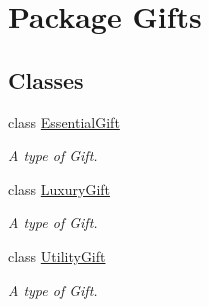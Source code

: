 \hypertarget{namespace_gifts}{}\section{Package Gifts}
\label{namespace_gifts}
\subsection*{Classes}
\begin{DoxyCompactItemize}
\item 
class \hyperlink{class_gifts_1_1_essential_gift}{Essential\+Gift}
\begin{DoxyCompactList}\small\item\em A type of Gift. \end{DoxyCompactList}\item 
class \hyperlink{class_gifts_1_1_luxury_gift}{Luxury\+Gift}
\begin{DoxyCompactList}\small\item\em A type of Gift. \end{DoxyCompactList}\item 
class \hyperlink{class_gifts_1_1_utility_gift}{Utility\+Gift}
\begin{DoxyCompactList}\small\item\em A type of Gift. \end{DoxyCompactList}\end{DoxyCompactItemize}
